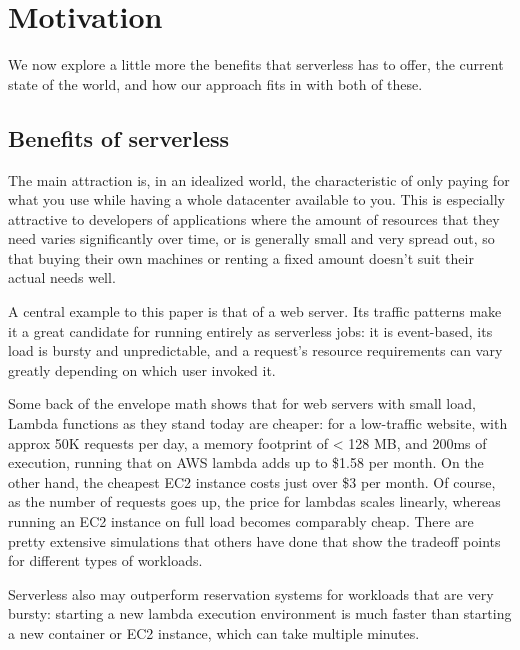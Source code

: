 \section{Motivation}\label{motivation}

We now explore a little more the benefits that serverless has to offer, the
current state of the world, and how our approach fits in with both of these.

\subsection{Benefits of serverless}

The main attraction is, in an idealized world, the characteristic of only paying
for what you use while having a whole datacenter available to you. This is
especially attractive to developers of applications where the amount of
resources that they need varies significantly over time, or is generally small
and very spread out, so that buying their own machines or renting a fixed amount
doesn't suit their actual needs well.

A central example to this paper is that of a web server. Its traffic patterns
make it a great candidate for running entirely as serverless jobs: it is
event-based, its load is bursty and unpredictable, and a request's resource
requirements can vary greatly depending on which user invoked it.


Some back of the envelope math shows that for web servers with small load,
Lambda functions as they stand today are cheaper: for a low-traffic website,
with approx 50K requests per day, a memory footprint of < 128 MB, and 200ms of
execution, running that on AWS lambda adds up to \$1.58 per month. On the other
hand, the cheapest EC2 instance costs just over \$3 per month. Of course, as the
number of requests goes up, the price for lambdas scales linearly, whereas
running an EC2 instance on full load becomes comparably cheap. There are pretty
extensive simulations that others have done that show the tradeoff points for
different types of workloads.

Serverless also may outperform reservation systems for workloads that are very
bursty: starting a new lambda execution environment is much faster than starting
a new container or EC2 instance, which can take multiple minutes.


